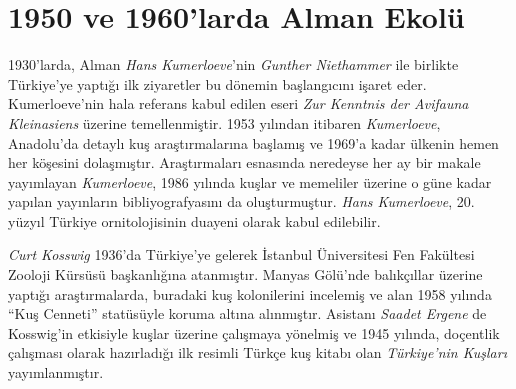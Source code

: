 \documentclass[
  a4paper,
  DIV=11,
  numbers=noendperiod]{scrartcl}
\begin{document}
\section*{1950 ve 1960'larda Alman
Ekolü}\label{ve-1960larda-alman-ekoluxfc}


1930'larda, Alman \emph{Hans Kumerloeve}'nin \emph{Gunther Niethammer}
ile birlikte Türkiye'ye yaptığı ilk ziyaretler bu dönemin başlangıcını
işaret eder. Kumerloeve'nin hala referans kabul edilen eseri \emph{Zur
Kenntnis der Avifauna Kleinasiens} üzerine temellenmiştir. 1953 yılından
itibaren \emph{Kumerloeve}, Anadolu'da detaylı kuş araştırmalarına
başlamış ve 1969'a kadar ülkenin hemen her köşesini dolaşmıştır.
Araştırmaları esnasında neredeyse her ay bir makale yayımlayan
\emph{Kumerloeve}, 1986 yılında kuşlar ve memeliler üzerine o güne kadar
yapılan yayınların bibliyografyasını da oluşturmuştur. \emph{Hans
Kumerloeve}, 20. yüzyıl Türkiye ornitolojisinin duayeni olarak kabul
edilebilir.

\emph{Curt Kosswig} 1936'da Türkiye'ye gelerek İstanbul Üniversitesi Fen
Fakültesi Zooloji Kürsüsü başkanlığına atanmıştır. Manyas Gölü'nde
balıkçıllar üzerine yaptığı araştırmalarda, buradaki kuş kolonilerini
incelemiş ve alan 1958 yılında ``Kuş Cenneti'' statüsüyle koruma altına
alınmıştır. Asistanı \emph{Saadet Ergene} de Kosswig'in etkisiyle kuşlar
üzerine çalışmaya yönelmiş ve 1945 yılında, doçentlik çalışması olarak
hazırladığı ilk resimli Türkçe kuş kitabı olan \emph{Türkiye'nin
Kuşları} yayımlanmıştır.
\end{document}
